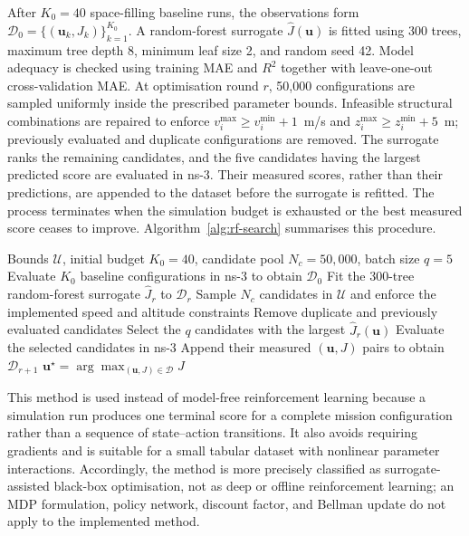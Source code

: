 After $K_0=40$ space-filling baseline runs, the observations form
$\mathcal{D}_0=\{(\mathbf{u}_k,J_k)\}_{k=1}^{K_0}$. A random-forest surrogate
$\widehat{J}(\mathbf{u})$ is fitted using 300 trees, maximum tree depth 8,
minimum leaf size 2, and random seed 42. Model adequacy is checked using
training MAE and $R^2$ together with leave-one-out cross-validation MAE. At
optimisation round $r$, 50,000 configurations are sampled uniformly inside
the prescribed parameter bounds. Infeasible structural combinations are
repaired to enforce $v_i^{\max}\geq v_i^{\min}+1$~m/s and
$z_i^{\max}\geq z_i^{\min}+5$~m; previously evaluated and duplicate
configurations are removed. The surrogate ranks the remaining candidates,
and the five candidates having the largest predicted score are evaluated in
ns-3. Their measured scores, rather than their predictions, are appended to
the dataset before the surrogate is refitted. The process terminates when the
simulation budget is exhausted or the best measured score ceases to improve.
Algorithm~\ref{alg:rf-search} summarises this procedure.

\begin{algorithm}[t]
\caption{Random-forest-assisted UAV configuration search}
\label{alg:rf-search}
\begin{algorithmic}[1]
\REQUIRE Bounds $\mathcal{U}$, initial budget $K_0=40$, candidate pool
$N_c=50{,}000$, batch size $q=5$
\STATE Evaluate $K_0$ baseline configurations in ns-3 to obtain
$\mathcal{D}_0$
  \STATE Fit the 300-tree random-forest surrogate $\widehat{J}_r$ to
  $\mathcal{D}_r$
  \STATE Sample $N_c$ candidates in $\mathcal{U}$ and enforce the implemented
  speed and altitude constraints
  \STATE Remove duplicate and previously evaluated candidates
  \STATE Select the $q$ candidates with the largest
  $\widehat{J}_r(\mathbf{u})$
  \STATE Evaluate the selected candidates in ns-3
  \STATE Append their measured $(\mathbf{u},J)$ pairs to obtain
  $\mathcal{D}_{r+1}$
\ENDFOR
\RETURN $\mathbf{u}^{\star}=\arg\max_{(\mathbf{u},J)\in\mathcal{D}}J$
\end{algorithmic}
\end{algorithm}

This method is used instead of model-free reinforcement learning because a
simulation run produces one terminal score for a complete mission
configuration rather than a sequence of state--action transitions. It also
avoids requiring gradients and is suitable for a small tabular dataset with
nonlinear parameter interactions. Accordingly, the method is more precisely
classified as surrogate-assisted black-box optimisation, not as deep or
offline reinforcement learning; an MDP formulation, policy network, discount
factor, and Bellman update do not apply to the implemented method.

